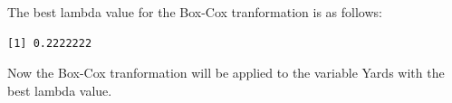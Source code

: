 \documentclass[
  super,
  preprint,
  3p]{elsarticle}
\newenvironment{Shaded}{\begin{snugshade}}{\end{snugshade}}
\newcommand{\AttributeTok}[1]{\textcolor[rgb]{0.40,0.45,0.13}{#1}}
\newcommand{\FunctionTok}[1]{\textcolor[rgb]{0.28,0.35,0.67}{#1}}
\newcommand{\NormalTok}[1]{\textcolor[rgb]{0.00,0.23,0.31}{#1}}
\newcommand{\OtherTok}[1]{\textcolor[rgb]{0.00,0.23,0.31}{#1}}
\newcommand{\SpecialCharTok}[1]{\textcolor[rgb]{0.37,0.37,0.37}{#1}}
\begin{document}
The best lambda value for the Box-Cox tranformation is as follows:

\begin{Shaded}
\end{Shaded}

\begin{verbatim}
[1] 0.2222222
\end{verbatim}

Now the Box-Cox tranformation will be applied to the variable Yards with
the best lambda value.

\begin{Shaded}
\end{Shaded}
\end{document}
